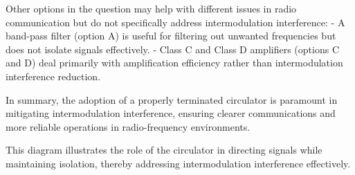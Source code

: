 Other options in the question may help with different issues in radio communication but do not specifically address intermodulation interference:
- A band-pass filter (option A) is useful for filtering out unwanted frequencies but does not isolate signals effectively.
- Class C and Class D amplifiers (options C and D) deal primarily with amplification efficiency rather than intermodulation interference reduction.

In summary, the adoption of a properly terminated circulator is paramount in mitigating intermodulation interference, ensuring clearer communications and more reliable operations in radio-frequency environments.

\begin{center}
\end{center} 

This diagram illustrates the role of the circulator in directing signals while maintaining isolation, thereby addressing intermodulation interference effectively.